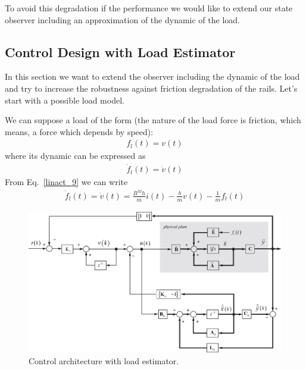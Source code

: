 \documentclass[11pt,a4paper,oneside]{book}
\numberwithin{equation}{section}
\theoremstyle{it}
\theoremstyle{definition}
\begin{document}
To avoid this degradation if the performance we would like to extend our state 
observer including an approximation of the dynamic of the load.

\subsection{Control Design with Load Estimator}
In this section we want to extend the observer including the dynamic of the 
load and try to increase the robustness against friction degradation of the 
rails. Let's start with a possible load model.

We can suppose a load of the form (the nature of the load force is friction, 
which means, a force which depends by speed):
\begin{equation*}
	\begin{aligned}
		{f}_l(t)  = {v}(t)
	\end{aligned}
\end{equation*}
where its dynamic can be expressed as
\begin{equation*}
	\begin{aligned}
		\dot{f}_l(t)  = \dot{v}(t)
	\end{aligned}
\end{equation*}
From Eq.~\ref{linact_9} we can write 
\begin{equation*}
	\begin{aligned}
		\dot{f}_l(t)  = \dot{v}(t) = \frac{B^Mh}{m} i(t)-\frac{b}{m} 
		v(t)-\frac{1}{m}f_l(t) 
	\end{aligned}
\end{equation*}
\begin{figure}[H]
	\centering
	\includegraphics[width = 460pt, angle = 0, 
	keepaspectratio]{figures/moving_coil/servo_linear_actuator_2.eps}
	\captionsetup{width=0.5\textwidth, font=small}		
	\caption{Control architecture with load estimator.}
	\label{ctrl_coil_2}
\end{figure}
\end{document}
